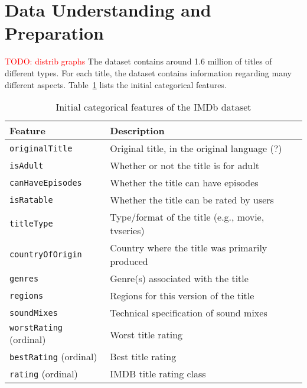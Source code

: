 \section{Data Understanding and Preparation}
\textcolor{red}{TODO: distrib graphs}
The dataset contains around 1.6 million of titles of different types.
For each title, the dataset contains information regarding many different
aspects. Table~\ref{tab:initial_categorical_features} lists the initial categorical
features.
\begin{table}[H]
    \centering
    \begin{tabular}{|p{4cm}|p{9cm}|}

        \hline
        \textbf{Feature} & \textbf{Description} \\ \hline
        \texttt{originalTitle} & Original title, in the original language (?) \\ \hline
        \texttt{isAdult} & Whether or not the title is for adult \\ \hline
        \texttt{canHaveEpisodes} & Whether the title can have episodes \\ \hline
        \texttt{isRatable} & Whether the title can be rated by users \\ \hline
        \texttt{titleType} & Type/format of the title (e.g., movie, tvseries) \\ \hline
        \texttt{countryOfOrigin} & Country where the title was primarily produced \\ \hline
        \texttt{genres} & Genre(s) associated with the title \\ \hline
        \texttt{regions} & Regions for this version of the title \\ \hline
        \texttt{soundMixes} & Technical specification of sound mixes \\ \hline
        \texttt{worstRating} (ordinal) & Worst title rating \\ \hline
        \texttt{bestRating} (ordinal) & Best title rating \\ \hline
        \texttt{rating} (ordinal) & IMDB title rating class \\ \hline
    \end{tabular}
    \caption{Initial categorical features of the IMDb dataset}
    \label{tab:initial_categorical_features}
\end{table}


